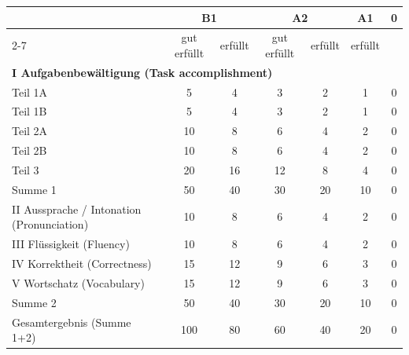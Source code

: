 \documentclass[a4paper]{article}
\begin{document}
        \begin{table}[H]
            \centering
            \begin{tabular}{|l|c|c|c|c|c|c|}
                \hline
                & \multicolumn{2}{c|}{B1} & \multicolumn{2}{c|}{A2} & A1 & 0 \\
                \cline{2-7}
                & gut erfüllt & erfüllt & gut erfüllt & erfüllt & erfüllt &   \\
                \hline
                \multicolumn{7}{|l|}{\textbf{I Aufgabenbewältigung (Task accomplishment)}} \\
                \hline
                Teil 1A                                    & 5           & 4       & 3           & 2       & 1       & 0 \\
                Teil 1B                                    & 5           & 4       & 3           & 2       & 1       & 0 \\
                Teil 2A                                    & 10          & 8       & 6           & 4       & 2       & 0 \\
                Teil 2B                                    & 10          & 8       & 6           & 4       & 2       & 0 \\
                Teil 3                                     & 20          & 16      & 12          & 8       & 4       & 0 \\
                \hline
                Summe 1                                    & 50          & 40      & 30          & 20      & 10      & 0 \\
                \hline
                II Aussprache / Intonation (Pronunciation) & 10          & 8       & 6           & 4       & 2       & 0 \\
                III Flüssigkeit (Fluency)                  & 10          & 8       & 6           & 4       & 2       & 0 \\
                IV Korrektheit (Correctness)               & 15          & 12      & 9           & 6       & 3       & 0 \\
                V Wortschatz (Vocabulary)                  & 15          & 12      & 9           & 6       & 3       & 0 \\
                \hline
                Summe 2                                    & 50          & 40      & 30          & 20      & 10      & 0 \\
                \hline
                Gesamtergebnis (Summe 1+2)                 & 100         & 80      & 60          & 40      & 20      & 0 \\
                \hline
            \end{tabular}
        \end{table}
        
\end{document}
